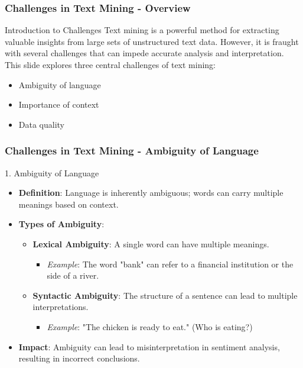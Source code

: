 \documentclass[aspectratio=169]{beamer}
\begin{document}
\begin{frame}[fragile]
    \frametitle{Challenges in Text Mining - Overview}
    \begin{block}{Introduction to Challenges}
        Text mining is a powerful method for extracting valuable insights from large sets of unstructured text data. However, it is fraught with several challenges that can impede accurate analysis and interpretation. This slide explores three central challenges of text mining:
        \begin{itemize}
            \item Ambiguity of language
            \item Importance of context
            \item Data quality
        \end{itemize}
    \end{block}
\end{frame}

\begin{frame}[fragile]
    \frametitle{Challenges in Text Mining - Ambiguity of Language}
    \begin{block}{1. Ambiguity of Language}
        \begin{itemize}
            \item \textbf{Definition}: Language is inherently ambiguous; words can carry multiple meanings based on context.
            \item \textbf{Types of Ambiguity}:
            \begin{itemize}
                \item \textbf{Lexical Ambiguity}: A single word can have multiple meanings.
                \begin{itemize}
                    \item \textit{Example}: The word "bank" can refer to a financial institution or the side of a river.
                \end{itemize}
                \item \textbf{Syntactic Ambiguity}: The structure of a sentence can lead to multiple interpretations.
                \begin{itemize}
                    \item \textit{Example}: "The chicken is ready to eat." (Who is eating?)
                \end{itemize}
            \end{itemize}
            \item \textbf{Impact}: Ambiguity can lead to misinterpretation in sentiment analysis, resulting in incorrect conclusions.
        \end{itemize}
    \end{block}
\end{frame}
\end{document}
